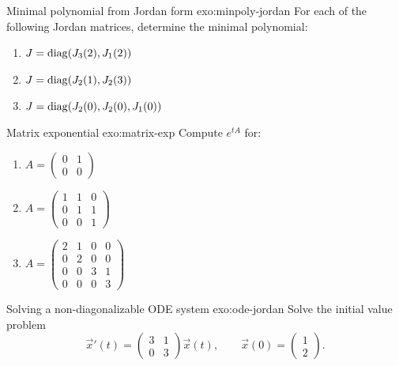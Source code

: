 \begin{exercise}{Minimal polynomial from Jordan form \intermediate}%
{exo:minpoly-jordan}
For each of the following Jordan matrices, determine the minimal
polynomial:
\begin{enumerate}[label=(\alph*)]
  \item $J = \operatorname{diag}(J_3(2), J_1(2))$
  \item $J = \operatorname{diag}(J_2(1), J_2(3))$
  \item $J = \operatorname{diag}(J_2(0), J_2(0), J_1(0))$
\end{enumerate}
\end{exercise}

\begin{exercise}{Matrix exponential \intermediate}{exo:matrix-exp}
Compute $e^{tA}$ for:
\begin{enumerate}[label=(\alph*)]
  \item $A = \begin{pmatrix} 0 & 1 \\ 0 & 0 \end{pmatrix}$
  \item $A = \begin{pmatrix} 1 & 1 & 0 \\ 0 & 1 & 1 \\ 0 & 0 & 1
    \end{pmatrix}$
  \item $A = \begin{pmatrix} 2 & 1 & 0 & 0 \\ 0 & 2 & 0 & 0 \\
    0 & 0 & 3 & 1 \\ 0 & 0 & 0 & 3 \end{pmatrix}$
\end{enumerate}
\end{exercise}

\begin{exercise}{Solving a non-diagonalizable ODE system
\intermediate}{exo:ode-jordan}
Solve the initial value problem
\[
  \vec{x}'(t) = \begin{pmatrix} 3 & 1 \\ 0 & 3 \end{pmatrix}
  \vec{x}(t), \qquad
  \vec{x}(0) = \begin{pmatrix} 1 \\ 2 \end{pmatrix}.
\]
\end{exercise}

